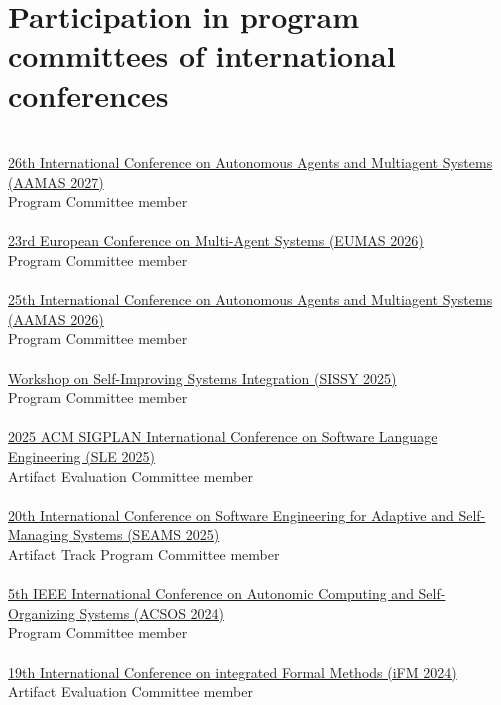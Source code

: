 \section{{\color{black}Participation in program committees of international conferences}}
\halfblankline \\
\href{https://warwick.ac.uk/fac/sci/dcs/aamas2027/}{26th International Conference on Autonomous Agents and Multiagent Systems (AAMAS 2027)}
\\ Program Committee member \\
\halfblankline \\
\href{https://euramas.github.io/eumas2026/}{23rd European Conference on Multi-Agent Systems (EUMAS 2026)}
\\ Program Committee member \\
\halfblankline \\
\href{https://cyprusconferences.org/aamas2026/}{25th International Conference on Autonomous Agents and Multiagent Systems (AAMAS 2026)}
\\ Program Committee member \\
\halfblankline \\
\href{https://sissy.telecom-paristech.fr/}{Workshop on Self-Improving Systems Integration (SISSY 2025)}
\\ Program Committee member \\
\halfblankline \\
\href{https://conf.researchr.org/home/sle-2025}{2025 ACM SIGPLAN International Conference on Software Language Engineering (SLE 2025)}
\\ Artifact Evaluation Committee member \\
\halfblankline \\
\href{https://conf.researchr.org/home/seams-2025}{20th International Conference on Software Engineering for Adaptive and Self-Managing Systems (SEAMS 2025)}
\\ Artifact Track Program Committee member \\
\halfblankline \\
\href{https://2024.acsos.org/}{5th IEEE International Conference on Autonomic Computing and Self-Organizing Systems (ACSOS 2024)}
\\ Program Committee member \\
\halfblankline \\
\href{https://ifm2024.cs.manchester.ac.uk/}{19th International Conference on integrated Formal Methods
(iFM 2024)}
\\ Artifact Evaluation Committee member \\

